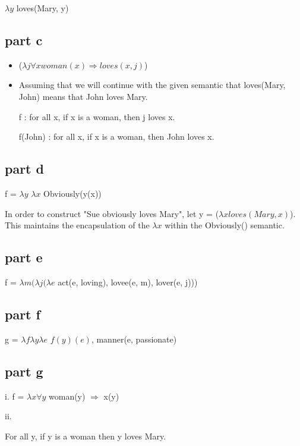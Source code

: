 \documentclass[12pt, letterpaper]{article}
\begin{document}
$\lambda y$ loves(Mary, y)

\subsection{part c}

\begin{itemize}  
\item %
($\lambda j \forall x woman(x) \Rightarrow loves(x,j)$) 
\item %
Assuming that we will continue with the given semantic that loves(Mary, John) means that John loves Mary.

f : for all x, if x is a woman, then j loves x.

f(John) : for all x, if x is a woman, then John loves x.

\end{itemize}

\subsection{part d}

f = $\lambda y$ $\lambda x$ Obviously(y(x))

In order to construct "Sue obviously loves Mary", let y = ($\lambda x loves(Mary, x)$). This maintains the encapsulation of the $\lambda x$ within the Obviously() semantic. 

\subsection{part e}
f = $\lambda m ( \lambda j ( \lambda e$ act(e, loving), lovee(e, m), lover(e, j)))

\subsection{part f}

g = $\lambda f \lambda y \lambda e$ $f(y)(e)$, manner(e, passionate)

\subsection{part g}

i. f = $\lambda x \forall y$ woman(y) $\Rightarrow$ x(y)

ii. 

For all y, if y is a woman then y loves Mary.
\end{document}
